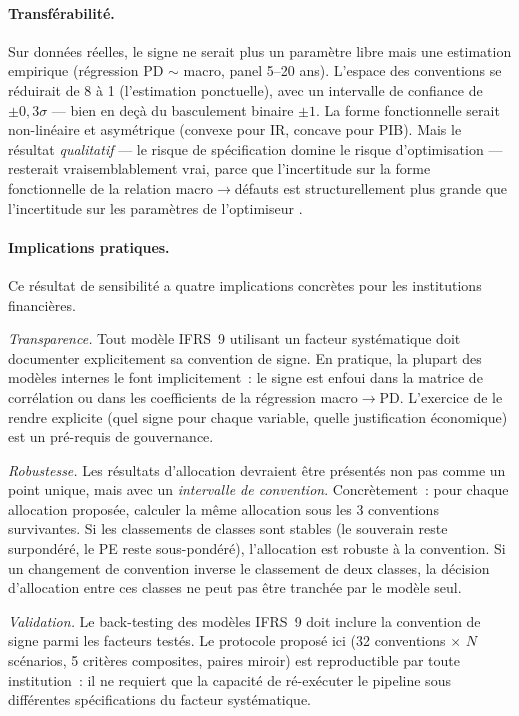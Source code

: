 \documentclass[10pt, a4paper, oneside]{report}
\theoremstyle{definition}
\begin{document}
\paragraph{Transférabilité.} Sur données réelles, le signe ne serait plus un paramètre libre mais une estimation empirique (régression PD $\sim$ macro, panel 5--20 ans). L'espace des conventions se réduirait de 8 à 1 (l'estimation ponctuelle), avec un intervalle de confiance de $\pm 0{,}3\sigma$ --- bien en deçà du basculement binaire $\pm 1$. La forme fonctionnelle serait non-linéaire et asymétrique (convexe pour IR, concave pour PIB). Mais le résultat \emph{qualitatif} --- le risque de spécification domine le risque d'optimisation --- resterait vraisemblablement vrai, parce que l'incertitude sur la forme fonctionnelle de la relation macro$\to$défauts est structurellement plus grande que l'incertitude sur les paramètres de l'optimiseur \citep{mcneil_frey_embrechts2015}.

\paragraph{Implications pratiques.} Ce résultat de sensibilité a quatre implications concrètes pour les institutions financières.

\emph{Transparence.} Tout modèle IFRS~9 utilisant un facteur systématique doit documenter explicitement sa convention de signe. En pratique, la plupart des modèles internes le font implicitement~: le signe est enfoui dans la matrice de corrélation ou dans les coefficients de la régression macro$\to$PD. L'exercice de le rendre explicite (quel signe pour chaque variable, quelle justification économique) est un pré-requis de gouvernance.

\emph{Robustesse.} Les résultats d'allocation devraient être présentés non pas comme un point unique, mais avec un \emph{intervalle de convention}. Concrètement~: pour chaque allocation proposée, calculer la même allocation sous les 3 conventions survivantes. Si les classements de classes sont stables (le souverain reste surpondéré, le PE reste sous-pondéré), l'allocation est robuste à la convention. Si un changement de convention inverse le classement de deux classes, la décision d'allocation entre ces classes ne peut pas être tranchée par le modèle seul.

\emph{Validation.} Le back-testing des modèles IFRS~9 doit inclure la convention de signe parmi les facteurs testés. Le protocole proposé ici (32 conventions $\times$ $N$ scénarios, 5 critères composites, paires miroir) est reproductible par toute institution~: il ne requiert que la capacité de ré-exécuter le pipeline sous différentes spécifications du facteur systématique.
\end{document}
